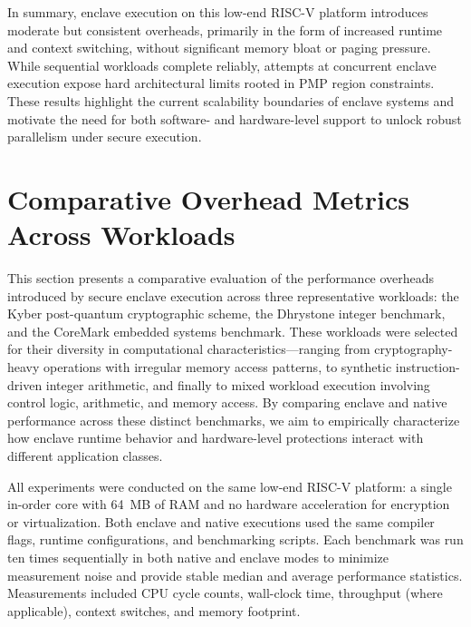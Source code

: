 In summary, enclave execution on this low-end RISC-V platform introduces moderate but consistent overheads, primarily in the form of increased runtime and context switching, without significant memory bloat or paging pressure. While sequential workloads complete reliably, attempts at concurrent enclave execution expose hard architectural limits rooted in PMP region constraints. These results highlight the current scalability boundaries of enclave systems and motivate the need for both software- and hardware-level support to unlock robust parallelism under secure execution.

\section{Comparative Overhead Metrics Across Workloads}
\label{sec:workload-sensitivity}

This section presents a comparative evaluation of the performance overheads introduced by secure enclave execution across three representative workloads: the Kyber post-quantum cryptographic scheme, the Dhrystone integer benchmark, and the CoreMark embedded systems benchmark. These workloads were selected for their diversity in computational characteristics—ranging from cryptography-heavy operations with irregular memory access patterns, to synthetic instruction-driven integer arithmetic, and finally to mixed workload execution involving control logic, arithmetic, and memory access. By comparing enclave and native performance across these distinct benchmarks, we aim to empirically characterize how enclave runtime behavior and hardware-level protections interact with different application classes.

All experiments were conducted on the same low-end RISC-V platform: a single in-order core with 64~MB of RAM and no hardware acceleration for encryption or virtualization. Both enclave and native executions used the same compiler flags, runtime configurations, and benchmarking scripts. Each benchmark was run ten times sequentially in both native and enclave modes to minimize measurement noise and provide stable median and average performance statistics. Measurements included CPU cycle counts, wall-clock time, throughput (where applicable), context switches, and memory footprint.

